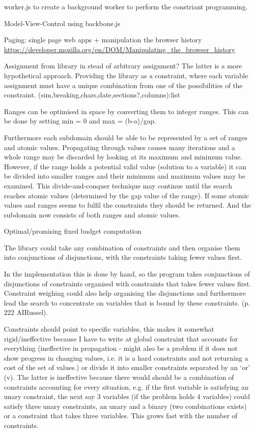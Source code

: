 worker.js to create a background worker to perform the constriant programming.

Model-View-Control using backbone.js

Paging: single page web apps + manipulation the browser history \url{https://developer.mozilla.org/en/DOM/Manipulating_the_browser_history}


Assignment from library in stead of arbitrary assignment? The latter is a more hypothetical approach. Providing the library as a constraint, where each variable assignment must have a unique combination from one of the possibilities of the constraint.
(sim,breaking,chars,date,sections?,columns):list


Ranges can be optimised in space by converting them to integer ranges. This can be done by setting min = 0 and max = (b-a)/gap.

Furthermore each subdomain should be able to be represented by a set of ranges and atomic values. Propagating through values causes many iterations and a whole range may be discarded by looking at its maximum and minimum value. However, if the range holds a potential valid value (solution to a variable) it can be divided into smaller ranges and their minimum and maximum values may be examined. This divide-and-conquer technique may continue until the search reaches atomic values (determined by the gap value of the range). If some atomic values and ranges seems to fulfil the constraints they should be returned. And the subdomain now consists of both ranges and atomic values.

Optimal/promising
fixed budget computation

The library could take any combination of constraints and then organise them into conjunctions of disjunctions, with the constraints taking fewer values first.

In the implementation this is done by hand, so the program takes conjunctions of disjunctions of constraints organised with constraints that takes fewer values first. Constraint weighing could also help organising the disjunctions and furthermore lead the search to concentrate on variables that is bound by these constraints. (p. 222 AIRussel).

Constraints should point to specific variables, this makes it somewhat rigid/ineffective because I have to write at global constraint that accounts for everything (ineffective in propagation -  might also be a problem if it does not show progress in changing values, i.e. it is a hard constraints and not returning a cost of the set of values.) or divide it into smaller constraints separated by an `or' (v). The latter is ineffective because there would should be a combination of constraints accounting for every situation, e.g. if the first variable is satisfying an unary constraint, the next say 3 variables (if the problem holds 4 variables) could satisfy three unary constraints, an unary and a binary (two combinations exists) or a constraint that takes three variables. This grows fast with the number of constraints.


